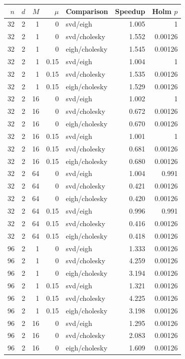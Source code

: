 \begin{tabular}{rrrrlrr}
\hline
$n$ & $d$ & $M$ & $\mu$ & Comparison & Speedup & Holm $p$ \\
\hline
32 & 2 & 1 & 0 & svd/eigh & 1.005 & 1 \\
32 & 2 & 1 & 0 & svd/cholesky & 1.552 & 0.00126 \\
32 & 2 & 1 & 0 & eigh/cholesky & 1.545 & 0.00126 \\
32 & 2 & 1 & 0.15 & svd/eigh & 1.004 & 1 \\
32 & 2 & 1 & 0.15 & svd/cholesky & 1.535 & 0.00126 \\
32 & 2 & 1 & 0.15 & eigh/cholesky & 1.529 & 0.00126 \\
32 & 2 & 16 & 0 & svd/eigh & 1.002 & 1 \\
32 & 2 & 16 & 0 & svd/cholesky & 0.672 & 0.00126 \\
32 & 2 & 16 & 0 & eigh/cholesky & 0.670 & 0.00126 \\
32 & 2 & 16 & 0.15 & svd/eigh & 1.001 & 1 \\
32 & 2 & 16 & 0.15 & svd/cholesky & 0.681 & 0.00126 \\
32 & 2 & 16 & 0.15 & eigh/cholesky & 0.680 & 0.00126 \\
32 & 2 & 64 & 0 & svd/eigh & 1.004 & 0.991 \\
32 & 2 & 64 & 0 & svd/cholesky & 0.421 & 0.00126 \\
32 & 2 & 64 & 0 & eigh/cholesky & 0.420 & 0.00126 \\
32 & 2 & 64 & 0.15 & svd/eigh & 0.996 & 0.991 \\
32 & 2 & 64 & 0.15 & svd/cholesky & 0.416 & 0.00126 \\
32 & 2 & 64 & 0.15 & eigh/cholesky & 0.418 & 0.00126 \\
96 & 2 & 1 & 0 & svd/eigh & 1.333 & 0.00126 \\
96 & 2 & 1 & 0 & svd/cholesky & 4.259 & 0.00126 \\
96 & 2 & 1 & 0 & eigh/cholesky & 3.194 & 0.00126 \\
96 & 2 & 1 & 0.15 & svd/eigh & 1.321 & 0.00126 \\
96 & 2 & 1 & 0.15 & svd/cholesky & 4.225 & 0.00126 \\
96 & 2 & 1 & 0.15 & eigh/cholesky & 3.198 & 0.00126 \\
96 & 2 & 16 & 0 & svd/eigh & 1.295 & 0.00126 \\
96 & 2 & 16 & 0 & svd/cholesky & 2.083 & 0.00126 \\
96 & 2 & 16 & 0 & eigh/cholesky & 1.609 & 0.00126 \\

\end{tabular}
